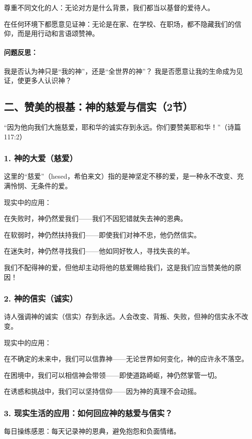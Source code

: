 \documentclass[a4paper, 12pt]{article}
\begin{document}
尊重不同文化的人：无论对方是什么背景，我们都当以基督的爱待人。

在任何环境下都愿意见证神：无论是在家、在学校、在职场，都不隐藏我们的信仰，而是用行动和言语颂赞神。
\paragraph*{问题反思：}

我是否认为神只是“我的神”，还是“全世界的神”？
我是否愿意让我的生命成为见证，使更多人认识神？
\subsection*{二、赞美的根基：神的慈爱与信实（2节）}
“因为他向我们大施慈爱，耶和华的诚实存到永远。你们要赞美耶和华！”（诗篇117:2）

\subsubsection*{1. 神的大爱（慈爱）}
\hspace{0.6cm}这里的“慈爱”（hesed，希伯来文）指的是神坚定不移的爱，是一种永不改变、充满怜悯、无条件的爱。

现实中的应用：

在失败时，神仍然爱我们——我们不因犯错就失去神的恩典。

在软弱时，神仍然扶持我们——即使我们对神不忠，他仍然信实。

在迷失时，神仍然寻找我们——他如同好牧人，寻找失丧的羊。

我们不配得神的爱，但他却主动将他的慈爱赐给我们，这是我们应当赞美他的原因！

\subsubsection*{2. 神的信实（诚实）}
\hspace{0.6cm}诗人强调神的诚实（信实）存到永远。人会改变、背叛、失败，但神的信实永不改变。

现实中的应用：

在不确定的未来中，我们可以信靠神——无论世界如何变化，神的应许永不落空。

在困境中，我们可以相信神会带领——即使道路崎岖，神仍然掌管一切。

在诱惑和挑战中，我们可以坚持信仰——因为神的真理不会动摇。

\subsubsection*{3. 现实生活的应用：如何回应神的慈爱与信实？}
\hspace{0.6cm}每日操练感恩：每天记录神的恩典，避免抱怨和负面情绪。
\end{document}
